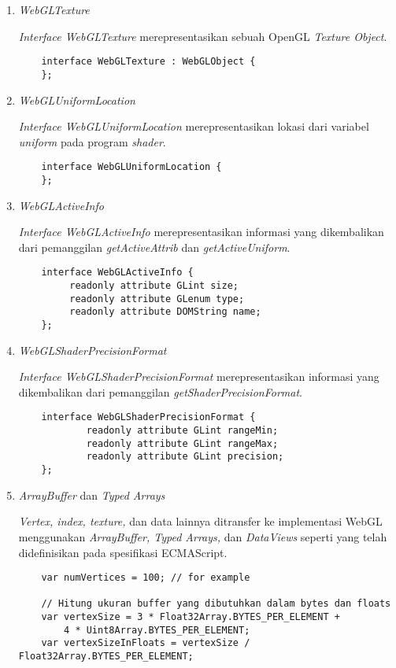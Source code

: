 \begin{enumerate}
\item {\it WebGLTexture}

	{\it Interface WebGLTexture} merepresentasikan sebuah OpenGL {\it Texture Object}.
	\begin{lstlisting}
	interface WebGLTexture : WebGLObject {
	};
	\end{lstlisting}
	
\item {\it WebGLUniformLocation}

	{\it Interface WebGLUniformLocation} merepresentasikan lokasi dari variabel {\it uniform} pada program {\it shader}.
	\begin{lstlisting}
	interface WebGLUniformLocation {
	};
	\end{lstlisting}
	
\item {\it WebGLActiveInfo}

	{\it Interface WebGLActiveInfo} merepresentasikan informasi yang dikembalikan dari pemanggilan {\it getActiveAttrib} dan {\it getActiveUniform}.
	\begin{lstlisting}
	interface WebGLActiveInfo {
  		 readonly attribute GLint size;
   		 readonly attribute GLenum type;
		 readonly attribute DOMString name;
	};
	\end{lstlisting}
	
\item {\it WebGLShaderPrecisionFormat}

	{\it Interface WebGLShaderPrecisionFormat} merepresentasikan informasi yang dikembalikan dari pemanggilan {\it getShaderPrecisionFormat}.
	\begin{lstlisting}
	interface WebGLShaderPrecisionFormat {
    		readonly attribute GLint rangeMin;
    		readonly attribute GLint rangeMax;
    		readonly attribute GLint precision;
	};
	\end{lstlisting}
	
\item {\it ArrayBuffer} dan {\it Typed Arrays}

	{\it Vertex, index, texture,} dan data lainnya ditransfer ke implementasi WebGL menggunakan {\it ArrayBuffer, Typed Arrays,} dan {\it DataViews} seperti yang telah didefinisikan pada spesifikasi ECMAScript.
	\begin{lstlisting}
	var numVertices = 100; // for example

	// Hitung ukuran buffer yang dibutuhkan dalam bytes dan floats
	var vertexSize = 3 * Float32Array.BYTES_PER_ELEMENT +
     	4 * Uint8Array.BYTES_PER_ELEMENT;
	var vertexSizeInFloats = vertexSize / Float32Array.BYTES_PER_ELEMENT;


\end{lstlisting}
\end{enumerate}
